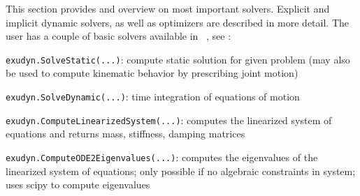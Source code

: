 This section provides and overview on most important solvers. Explicit and implicit dynamic solvers, as well as optimizers are described in more detail.
%
The user has a couple of basic solvers available in \codeName\ , see :
\bi
  \item \texttt{exudyn.SolveStatic(...)}: compute static solution for given problem (may also be used to compute kinematic behavior by prescribing joint motion)
  \item \texttt{exudyn.SolveDynamic(...)}: time integration of equations of motion
  \item \texttt{exudyn.ComputeLinearizedSystem(...)}: computes the linearized system of equations and returns mass, stiffness, damping matrices
  \item \texttt{exudyn.ComputeODE2Eigenvalues(...)}: computes the eigenvalues of the linearized system of equations; only possible if no algebraic constraints in system; uses scipy to compute eigenvalues
\ei
